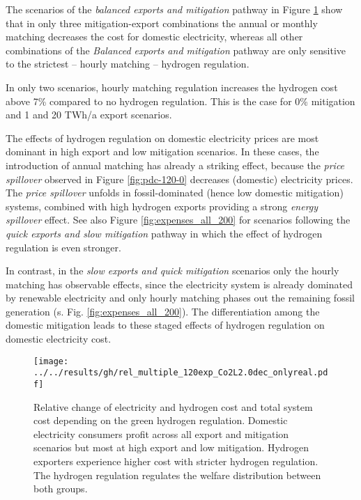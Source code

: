 The scenarios of the \textit{balanced exports and mitigation} pathway in Figure \ref{fig:expenses_real_120} show that in only three mitigation-export combinations the annual or monthly matching decreases the cost for domestic electricity, whereas all other combinations of the \textit{Balanced exports and mitigation} pathway are only sensitive to the strictest -- hourly matching -- hydrogen regulation. 

In only two scenarios, hourly matching regulation increases the hydrogen cost above 7\% compared to no hydrogen regulation. This is the case for 0\% mitigation and 1 and 20 TWh/a export scenarios.

The effects of hydrogen regulation on domestic electricity prices are most dominant in high export and low mitigation scenarios. 
In these cases, the introduction of annual matching has already a striking effect, because the \textit{price spillover} observed in Figure \ref{fig:pdc-120-0} decreases (domestic) electricity prices. The \textit{price spillover} unfolds in fossil-dominated (hence low domestic mitigation) systems, combined with high hydrogen exports providing a strong \textit{energy spillover} effect.
See also Figure \ref{fig:expenses_all_200} for  scenarios following the \textit{quick exports and slow mitigation} pathway in which the effect of hydrogen regulation is even stronger.

In contrast, in the \textit{slow exports and quick mitigation} scenarios only the hourly matching has observable effects, since the electricity system is already  dominated by renewable electricity and only hourly matching phases out the remaining fossil generation (s. Fig. \ref{fig:expenses_all_200}). The differentiation among the domestic mitigation leads to these staged effects of hydrogen regulation on domestic electricity cost.


\begin{figure}[h!]
    \centering
    \texttt{[image: ../../results/gh/rel\_multiple\_120exp\_Co2L2.0dec\_onlyreal.pdf]}
    \caption{Relative change of electricity and hydrogen cost and total system cost depending on the green hydrogen regulation. Domestic electricity consumers profit across all export and mitigation scenarios but most at high export and low mitigation. Hydrogen exporters experience higher cost with stricter hydrogen regulation. The hydrogen regulation regulates the welfare distribution between both groups.}
    \label{fig:expenses_real_120}
\end{figure}




